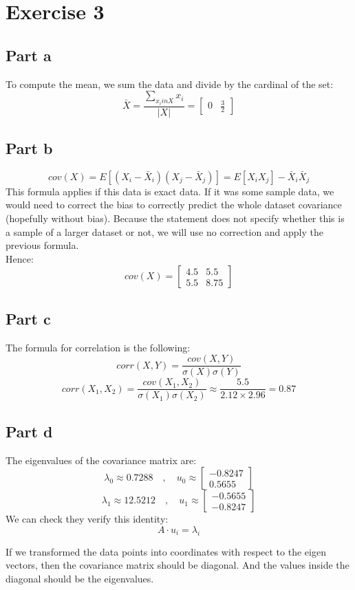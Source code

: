 \documentclass[a4paper, 10pt]{article}
\begin{document}
\section{Exercise 3}
\subsection{Part a}
To compute the mean, we sum the data and divide by the cardinal of the set:
$$
\bar{X} = \frac{\sum_{x_i in X}x_i}{\left\vert X\right\vert} = 
\begin{bmatrix}
    0 & \frac{3}{2}
\end{bmatrix}
$$

\subsection{Part b}
$$
cov(X) = E\left[(X_i - \bar X_i)(X_j - \bar X_j)\right] = E\left[X_iX_j\right] - \bar X_i\bar X_j
$$
This formula applies if this data is exact data. If it was some sample data, we would need to correct the 
bias to correctly predict the whole dataset covariance (hopefully without bias).
Because the statement does not specify whether this is a sample of a larger dataset or not,
we will use no correction and apply the previous formula.
\\
Hence:
$$
cov(X) = \begin{bmatrix}
            4.5 & 5.5\\
            5.5 & 8.75
        \end{bmatrix}
$$

\subsection{Part c}
The formula for correlation is the following:
$$
corr(X, Y) = \frac{cov(X, Y)}{\sigma(X)\sigma(Y)}
$$
$$
corr(X_1, X_2) = \frac{cov(X_1, X_2)}{\sigma(X_1)\sigma(X_2)} \approx \frac{5.5}{2.12\times 2.96} = 0.87
$$

\subsection{Part d}
The eigenvalues of the covariance matrix are:
$$
\lambda_0 \approx 0.7288 \quad , \quad u_0 \approx \begin{bmatrix}
                                            -0.8247\\
                                            0.5655
                                          \end{bmatrix}
$$
$$
\lambda_1 \approx 12.5212 \quad , \quad u_1 \approx \begin{bmatrix}
                                            -0.5655\\
                                            -0.8247
                                          \end{bmatrix}
$$
We can check they verify this identity:
$$
A \cdot u_i = \lambda_i
$$

If we transformed the data points into coordinates with respect to
the eigen vectors, then the covariance matrix should be diagonal. And 
the values inside the diagonal should be the eigenvalues.
\end{document}
